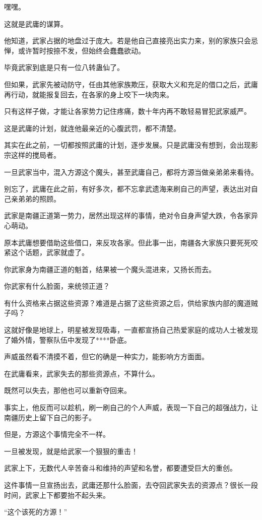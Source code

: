 \begin{this_body}
嘿嘿。

这就是武庸的谋算。

他知道，武家占据的地盘过于庞大。若是他自己直接亮出实力来，别的家族只会忌惮，或许暂时按捺不发，但始终会蠢蠢欲动。

毕竟武家到底是只有一位八转蛊仙了。

但如果，武家先被动防守，任由其他家族欺压，获取大义和充足的借口之后，武庸再行动，就能报复回去，在各家的身上咬下一块肉来。

只有这样子做，才能让各家势力记住疼痛，数十年内再不敢轻易冒犯武家威严。

这是武庸的计划，就连他最亲近的心腹武罚，都不清楚。

其实在此之前，一切都按照武庸的计划，逐步发展。只是武庸没有想到，会出现影宗这样的搅局者。

一旦武家当中，混入方源这个魔头，甚至武庸自己，都将方源当做亲弟弟来看待。

别忘了，武庸在此之前，有好多次，都不忘拿武遗海来刷自己的声望，表达出对自己亲弟弟的照顾。

武家是南疆正道第一势力，居然出现这样的事情，绝对令自身声望大跌，令各家异心萌动。

原本武庸想要借助这些借口，来反攻各家。但此事一出，南疆各大家族只要死死咬紧这个话题，武家就虚了。

你武家身为南疆正道的魁首，结果被一个魔头混进来，又扬长而去。

你武家有什么脸面，来统领正道？

有什么资格来占据这些资源？难道是占据了这些资源之后，供给家族内部的魔道贼子吗？

这就好像是地球上，明星被发现吸毒，一直都宣扬自己热爱家庭的成功人士被发现了婚外情，警察队伍中发现了****卧底。

声威虽然看不清摸不着，但它的确是一种实力，能影响方方面面。

在武庸看来，武家失去的那些资源点，不算什么。

既然可以失去，那他也可以重新夺回来。

事实上，他反而可以趁机，刷一刷自己的个人声威，表现一下自己的超强战力，让南疆历史上留下自己的影子。

但是，方源这个事情完全不一样。

一旦被发现，就是给武家一个狠狠的重击！

武家上下，无数代人辛苦奋斗和维持的声望和名誉，都要遭受巨大的重创。

这件事情一旦宣扬出去，武庸还那什么脸面，去夺回武家失去的资源点？很长一段时间，武家上下都要抬不起头来。

“这个该死的方源！”


\end{this_body}
